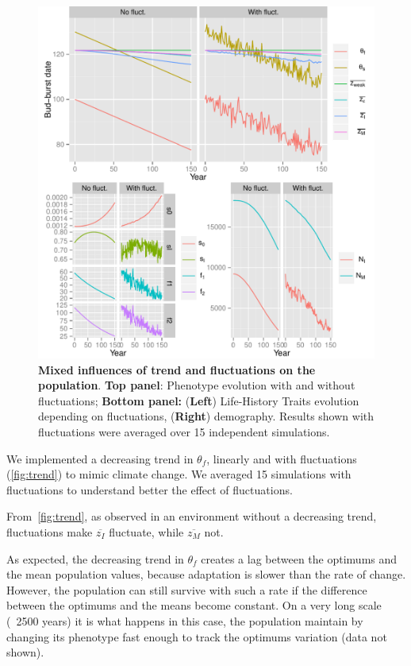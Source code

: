 \begin{figure}[ht!]
	\centering
	\includegraphics[scale=1]{Figures/Trend.pdf}
	\caption{\textbf{Mixed influences of trend and fluctuations on the population}. \textbf{Top panel}: Phenotype evolution with and without fluctuations; \textbf{Bottom panel:} (\textbf{Left}) Life-History Traits evolution depending on fluctuations, (\textbf{Right}) demography. Results shown with fluctuations were averaged over 15 independent simulations.}
	\label{fig:trend}
\end{figure}

We implemented a decreasing trend in $\theta_f$, linearly and with fluctuations (\autoref{fig:trend}) to mimic climate change. We averaged 15 simulations with fluctuations to understand better the effect of fluctuations.

From~\autoref{fig:trend}, as observed in an environment without a decreasing trend, fluctuations make $\overline{z_I}$ fluctuate, while $\overline{z_M}$ not.

As expected, the decreasing trend in $\theta_f$ creates a lag between the optimums and the mean population values, because adaptation is slower than the rate of change. However, the population can still survive with such a rate if the difference between the optimums and the means become constant. On a very long scale (~2500 years) it is what happens in this case, the population maintain by changing its phenotype fast enough to track the optimums variation (data not shown).

